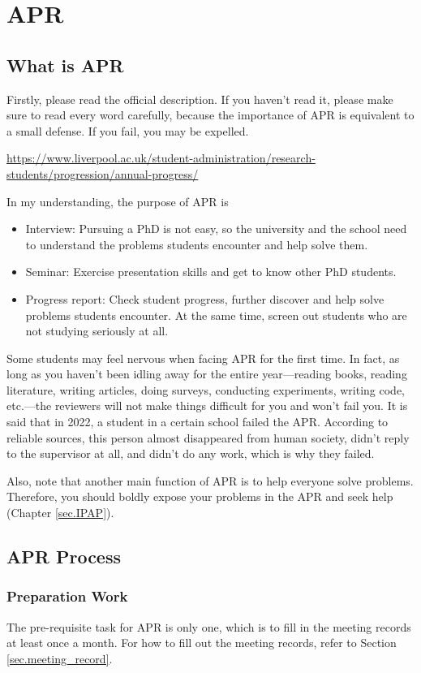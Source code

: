 \section{APR}
\subsection{What is APR}
Firstly, please read the official description. If you haven't read it, please make sure to read every word carefully, because the importance of APR is equivalent to a small defense. If you fail, you may be expelled.

\url{https://www.liverpool.ac.uk/student-administration/research-students/progression/annual-progress/}

In my understanding, the purpose of APR is
\begin{itemize}
    \item Interview: Pursuing a PhD is not easy, so the university and the school need to understand the problems students encounter and help solve them.
    \item Seminar: Exercise presentation skills and get to know other PhD students.
    \item Progress report: Check student progress, further discover and help solve problems students encounter. At the same time, screen out students who are not studying seriously at all.
\end{itemize}

Some students may feel nervous when facing APR for the first time. In fact, as long as you haven't been idling away for the entire year—reading books, reading literature, writing articles, doing surveys, conducting experiments, writing code, etc.—the reviewers will not make things difficult for you and won't fail you. It is said that in 2022, a student in a certain school failed the APR. According to reliable sources, this person almost disappeared from human society, didn't reply to the supervisor at all, and didn't do any work, which is why they failed.

Also, note that another main function of APR is to help everyone solve problems. Therefore, you should boldly expose your problems in the APR and seek help (Chapter \ref{sec.IPAP}).

\subsection{APR Process}
\subsubsection{Preparation Work}
The pre-requisite task for APR is only one, which is to fill in the meeting records at least once a month. For how to fill out the meeting records, refer to Section \ref{sec.meeting_record}.

